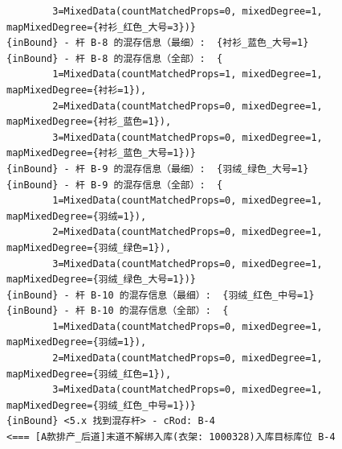 {\begin{verbatim}
		3=MixedData(countMatchedProps=0, mixedDegree=1, mapMixedDegree={衬衫_红色_大号=3})}
{inBound} - 杆 B-8 的混存信息（最细）:  {衬衫_蓝色_大号=1}
{inBound} - 杆 B-8 的混存信息（全部）:  {
		1=MixedData(countMatchedProps=1, mixedDegree=1, mapMixedDegree={衬衫=1}), 
		2=MixedData(countMatchedProps=0, mixedDegree=1, mapMixedDegree={衬衫_蓝色=1}), 
		3=MixedData(countMatchedProps=0, mixedDegree=1, mapMixedDegree={衬衫_蓝色_大号=1})}
{inBound} - 杆 B-9 的混存信息（最细）:  {羽绒_绿色_大号=1}
{inBound} - 杆 B-9 的混存信息（全部）:  {
		1=MixedData(countMatchedProps=0, mixedDegree=1, mapMixedDegree={羽绒=1}), 
		2=MixedData(countMatchedProps=0, mixedDegree=1, mapMixedDegree={羽绒_绿色=1}), 
		3=MixedData(countMatchedProps=0, mixedDegree=1, mapMixedDegree={羽绒_绿色_大号=1})}
{inBound} - 杆 B-10 的混存信息（最细）:  {羽绒_红色_中号=1}
{inBound} - 杆 B-10 的混存信息（全部）:  {
		1=MixedData(countMatchedProps=0, mixedDegree=1, mapMixedDegree={羽绒=1}), 
		2=MixedData(countMatchedProps=0, mixedDegree=1, mapMixedDegree={羽绒_红色=1}), 
		3=MixedData(countMatchedProps=0, mixedDegree=1, mapMixedDegree={羽绒_红色_中号=1})}
{inBound} <5.x 找到混存杆> - cRod: B-4
<=== [A款排产_后道]末道不解绑入库(衣架: 1000328)入库目标库位 B-4


\end{verbatim}}

